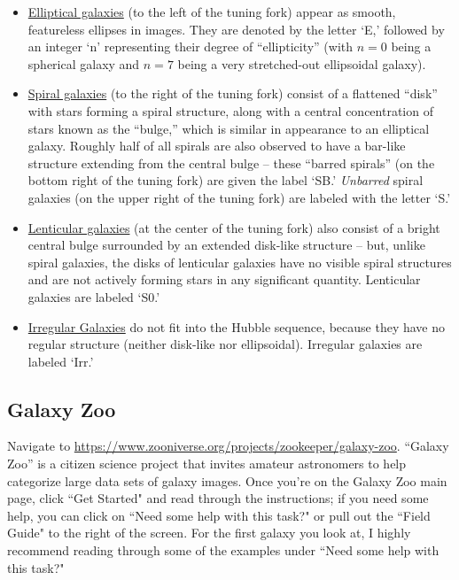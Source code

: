 \documentclass[11pt]{article}
\begin{document}
\begin{itemize}
    \item \underline{Elliptical galaxies} (to the left of the tuning fork) appear as smooth, featureless ellipses in images. They are denoted by the letter `E,' followed by an integer `n' representing their degree of ``ellipticity'' (with $n=0$ being a spherical galaxy and $n=7$ being a very stretched-out ellipsoidal galaxy).
    
    \item \underline{Spiral galaxies} (to the right of the tuning fork) consist of a flattened ``disk'' with stars forming a spiral structure, along with a central concentration of stars known as the ``bulge,'' which is similar in appearance to an elliptical galaxy. Roughly half of all spirals are also observed to have a bar-like structure extending from the central bulge -- these ``barred spirals'' (on the bottom right of the tuning fork) are given the label `SB.' \emph{Unbarred} spiral galaxies (on the upper right of the tuning fork) are labeled with the letter `S.' 
    
    \item \underline{Lenticular galaxies} (at the center of the tuning fork) also consist of a bright central bulge surrounded by an extended disk-like structure -- but, unlike spiral galaxies, the disks of lenticular galaxies have no visible spiral structures and are not actively forming stars in any significant quantity. Lenticular galaxies are labeled `S0.'
    
    \item \underline{Irregular Galaxies} do not fit into the Hubble sequence, because they have no regular structure (neither disk-like nor ellipsoidal). Irregular galaxies are labeled `Irr.'
\end{itemize}
    

\medskip

\subsection{Galaxy Zoo}

Navigate to \url{https://www.zooniverse.org/projects/zookeeper/galaxy-zoo}. ``Galaxy Zoo'' is a citizen science project that invites amateur astronomers to help categorize large data sets of galaxy images. Once you're on the Galaxy Zoo main page, click ``Get Started" and read through the instructions; if you need some help, you can click on ``Need some help with this task?" or pull out the ``Field Guide" to the right of the screen. For the first galaxy you look at, I highly recommend reading through some of the examples under ``Need some help with this task?" 
\end{document}
